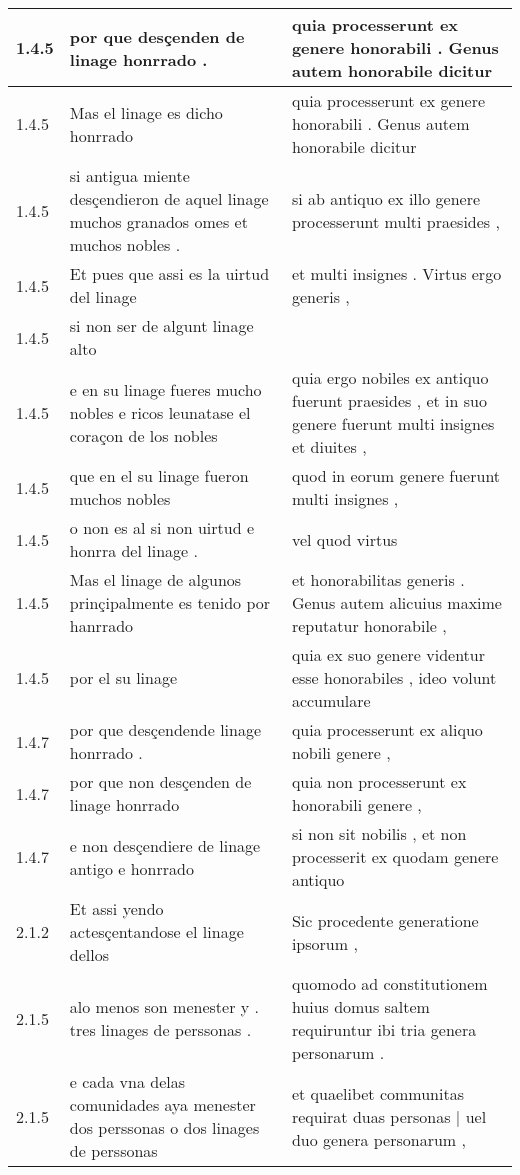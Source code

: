 \begin{tabular}{|p{1cm}|p{6.5cm}|p{6.5cm}|}
1.4.5 & por que desçenden de linage honrrado . & quia processerunt ex genere honorabili . Genus autem honorabile dicitur \\\hline
1.4.5 & Mas el linage es dicho honrrado & quia processerunt ex genere honorabili . Genus autem honorabile dicitur \\\hline
1.4.5 & si antigua miente desçendieron de aquel linage muchos granados omes et muchos nobles . & si ab antiquo ex illo genere processerunt multi praesides , \\\hline
1.4.5 & Et pues que assi es la uirtud del linage & et multi insignes . Virtus ergo generis , \\\hline
1.4.5 & si non ser de algunt linage alto &  \\\hline
1.4.5 & e en su linage fueres mucho nobles e ricos leunatase el coraçon de los nobles & quia ergo nobiles ex antiquo fuerunt praesides , et in suo genere fuerunt multi insignes et diuites , \\\hline
1.4.5 & que en el su linage fueron muchos nobles & quod in eorum genere fuerunt multi insignes , \\\hline
1.4.5 & o non es al si non uirtud e honrra del linage . & vel quod virtus \\\hline
1.4.5 & Mas el linage de algunos prinçipalmente es tenido por hanrrado & et honorabilitas generis . Genus autem alicuius maxime reputatur honorabile , \\\hline
1.4.5 & por el su linage & quia ex suo genere videntur esse honorabiles , ideo volunt accumulare \\\hline
1.4.7 & por que desçendende linage honrrado . & quia processerunt ex aliquo nobili genere , \\\hline
1.4.7 & por que non desçenden de linage honrrado & quia non processerunt ex honorabili genere , \\\hline
1.4.7 & e non desçendiere de linage antigo e honrrado & si non sit nobilis , et non processerit ex quodam genere antiquo \\\hline
2.1.2 & Et assi yendo actesçentandose el linage dellos & Sic procedente generatione ipsorum , \\\hline
2.1.5 & alo menos son menester y . tres linages de perssonas . & quomodo ad constitutionem huius domus saltem requiruntur ibi tria genera personarum . \\\hline
2.1.5 & e cada vna delas comunidades aya menester dos perssonas o dos linages de perssonas & et quaelibet communitas requirat duas personas | uel duo genera personarum , \\\hline

\end{tabular}
